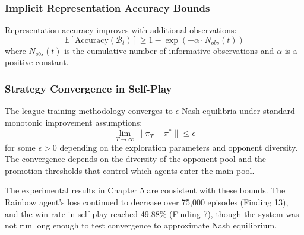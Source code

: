 \subsubsection{Implicit Representation Accuracy Bounds}
Representation accuracy improves with additional observations:
\begin{equation}
\mathbb{E}[\text{Accuracy}(\mathcal{B}_t)] \geq 1 - \exp(-\alpha \cdot N_{obs}(t))
\end{equation}
where $N_{obs}(t)$ is the cumulative number of informative observations and $\alpha$ is a positive constant.

\subsubsection{Strategy Convergence in Self-Play}
The league training methodology converges to $\epsilon$-Nash equilibria under standard monotonic improvement assumptions:
\begin{equation}
\lim_{T \to \infty} \| \pi_T - \pi^* \| \leq \epsilon
\end{equation}
for some $\epsilon > 0$ depending on the exploration parameters and opponent diversity. The convergence depends on the diversity of the opponent pool and the promotion thresholds that control which agents enter the main pool.

The experimental results in Chapter 5 are consistent with these bounds. The Rainbow agent's loss continued to decrease over 75,000 episodes (Finding 13), and the win rate in self-play reached 49.88\% (Finding 7), though the system was not run long enough to test convergence to approximate Nash equilibrium.




